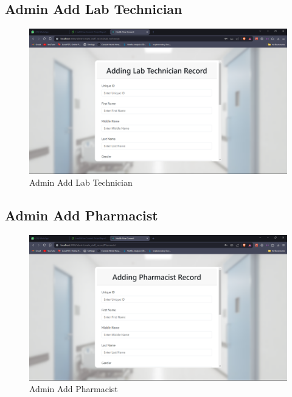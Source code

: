 \subsection{Admin Add Lab Technician}
\begin{figure}[h!]
    \centering
    \includegraphics[width=\textwidth]{Admin_add_Lab_Technician.png}
    \caption{Admin Add Lab Technician}
\end{figure}
\subsection{Admin Add Pharmacist}
\begin{figure}[h!]
    \centering
    \includegraphics[width=\textwidth]{Admin_add_Pharmacist.png}
    \caption{Admin Add Pharmacist}
\end{figure}

\clearpage
